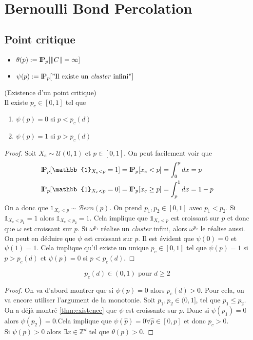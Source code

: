 \section{Bernoulli Bond Percolation}
\subsection{Point critique}
\begin{itemize}[label=\textbullet, left=0pt]
    \item $\theta(p) :=\text{I\kern-0.15em P}_p[\lVert C \rVert = \infty] $
    \item $\psi(p) :=\text{I\kern-0.15em P}_p["\text{Il existe un \textit{cluster} infini}"] $
\end{itemize}
\proposition(Existence d'un point critique)\\[10pt]\label{thm:existence}
Il existe $p_c \in [0,1]$ tel que
\begin{enumerate}[label=\roman*)]
    \item $ \psi(p) = 0$ si $p < p_c(d) $\\[0pt]
    \item $ \psi(p) = 1$ si $p > p_c(d) $\\
\end{enumerate}
\begin{proof}
    Soit $X_e \sim \mathcal{U}(0,1)$ et $p \in [0,1]$. On peut facilement voir que
    \begin{align*}
        \probP_p[\mathbb{1}_{X_e<p} = 1]&= \probP_p[x_e<p] = \int_{0}^{p}dx = p\\
        \probP_p[\mathbb{1}_{X_e<p} = 0]&= \probP_p[x_e\geq p]=\int_{p}^{1}dx =  1- p
    \end{align*}
    On a donc que $\mathbb{1}_{X_e<p}\sim \mathcal{B}ern(p)$.
    On prend $p_1,p_2 \in [0,1] $ avec $p_1<p_2$.
    Si $\mathbb{1}_{X_e<p_1} = 1$ alors $\mathbb{1}_{X_e<p_2} =1$. Cela implique que $\mathbb{1}_{X_e<p}$ est croissant sur $p$ et donc que $\omega$ est croissant sur $p$. 
    Si $\omega^{p_1}$ réalise un \textit{cluster} infini, alors $\omega^{p_2}$  le réalise aussi. 
    On peut en déduire que $\psi$ est croissant sur $p$.
    Il est évident que $\psi (0) = 0$ et $\psi(1)=1$. 
    Cela implique qu'il existe un unique $p_c \in [0,1]$ tel que $\psi(p) = 1$ si $p > p_c(d)$ et $\psi(p) = 0$ si $p < p_c(d)$.
\end{proof}
\begin{theorem}[]

    $$
    p_c(d) \in (0,1) \text{ pour $d\geq2$}
    $$
\end{theorem}
\begin{proof}
    On va d'abord montrer que si $\psi(p) = 0$ alors $p_c(d)>0$. Pour cela, on va encore utiliser l'argument de la monotonie. Soit $p_1,p_2 \in (0,1]$, tel que $p_1 \leq p_2$. On a déjà montré \ref{thm:existence} que $\psi$ est croissante sur $p$. Donc si $\psi(p_1) = 0$ alors $\psi(p_2) = 0$.Cela implique que $\psi(\hat{p}) = 0 \forall\hat{p} \in [0,p]$ et donc $p_c>0$.\\

    Si $\psi(p) > 0$ alors $\exists x \in \mathbb{Z}^d$ tel que $\theta(p)>0$.


\end{proof}

